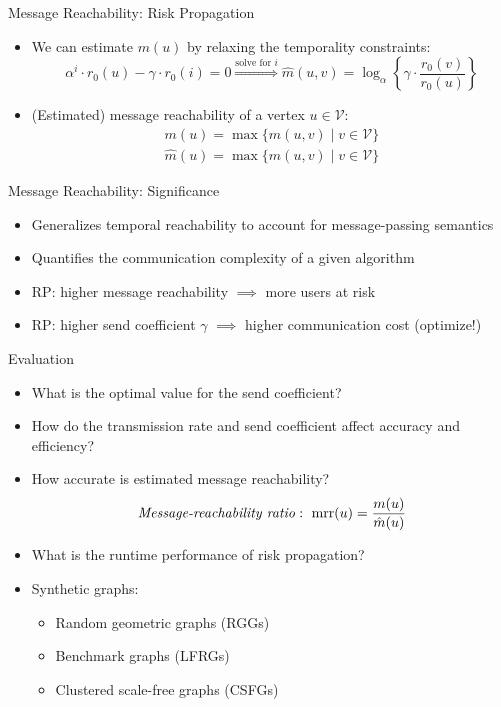 \documentclass[13pt,aspectratio=169]{beamer}
\newcommand{\trate}{\alpha}
\newcommand{\scoeff}{\gamma}
\newcommand{\vsym}{r}
\newcommand{\msym}{m}
\DeclareMathOperator{\mrr}{mrr}
\newcommand{\ival}{\vsym_0}
\newcommand{\reach}{\msym}
\newcommand{\estreach}{\hat{\msym}}
\newcommand{\variables}{\mathcal{V}}
\begin{document}
\begin{frame}{Message Reachability: Risk Propagation}
\begin{itemize}
\item We can estimate $\reach(u)$ by relaxing the temporality constraints:
	\begin{equation*}
	\trate^i \cdot \ival(u) - \scoeff \cdot \ival(i) = 0 \overset{\text{solve for $i$}}{\Longrightarrow} \estreach(u, v) = \log_{\trate}\left\{\scoeff \cdot \frac{\ival(v)}{\ival(u)} \right\}
	\end{equation*}
\item (Estimated) message reachability of a vertex $u \in \variables$:
	\begin{align*}
		\reach(u) = \max \{\reach(u, v) \mid v \in \variables \} \\
		\estreach(u) = \max \{\estreach(u, v) \mid v \in \variables \}
	\end{align*}
\end{itemize}
\end{frame}

\begin{frame}{Message Reachability: Significance}
\begin{itemize}
	\item Generalizes temporal reachability to account for message-passing semantics
	\item Quantifies the communication complexity of a given algorithm
	\item RP: higher message reachability $\implies$ more users at risk
	\item RP: higher send coefficient $\scoeff$ $\implies$ higher communication cost (optimize!)
\end{itemize}
\end{frame}

\begin{frame}{Evaluation}
\begin{itemize}
\item What is the optimal value for the send coefficient?
\item How do the transmission rate and send coefficient affect accuracy and efficiency?
\item How accurate is estimated message reachability?
	$$\text{\emph{Message-reachability ratio}}:~\mrr(u) = \frac{\reach(u)}{\estreach(u)}$$
\item What is the runtime performance of risk propagation?
\item Synthetic graphs:
	\begin{itemize}
	\item Random geometric graphs (RGGs) \cite{Dall2002}
	\item Benchmark graphs (LFRGs) \cite{Lancichinetti2008}
	\item Clustered scale-free graphs (CSFGs) \cite{Holme2002}
	\end{itemize}
\end{itemize}
\end{frame}
\end{document}
